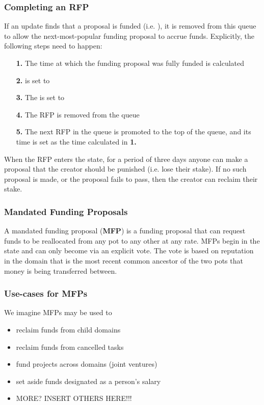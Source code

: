 \subsubsection*{Completing an RFP}
If an update finds that a proposal is funded (i.e. ), it is removed from this queue to allow the next-most-popular funding proposal to accrue funds. Explicitly, the following steps need to happen:
\begin{itemize}
 \item[\textbf{1.}] The time at which the funding proposal was fully funded is calculated%
 \item[\textbf{2.}]  is set to 
 \item[\textbf{3.}] The  is set to 
 \item[\textbf{4.}] The RFP is removed from the queue
 \item[\textbf{5.}] The next RFP in the queue is promoted to the top of the queue, and its  time is set as the time calculated in \textbf{1.}
\end{itemize}


When the RFP enters the  state, for a period of three days anyone can make a proposal that the creator should be punished (i.e. lose their stake). If no such proposal is made, or the proposal fails to pass, then the creator can reclaim their stake.




\subsubsection{Mandated Funding Proposals}
A mandated funding proposal (\textbf{MFP}) is a funding proposal that can request funds to be reallocated from any pot to any other at any rate. MFPs begin in the  state and can only become  via an explicit vote. The vote is based on reputation in the domain that is the most recent common ancestor of the two pots that money is being transferred between.

\subsubsection*{Use-cases for MFPs}
We imagine MFPs may be used to
\begin{itemize}
 \item reclaim funds from child domains
 \item reclaim funds from cancelled tasks
 \item fund projects across domains (joint ventures)
 \item set aside funds designated as a person's salary
 \item MORE? INSERT OTHERS HERE!!!
\end{itemize}


